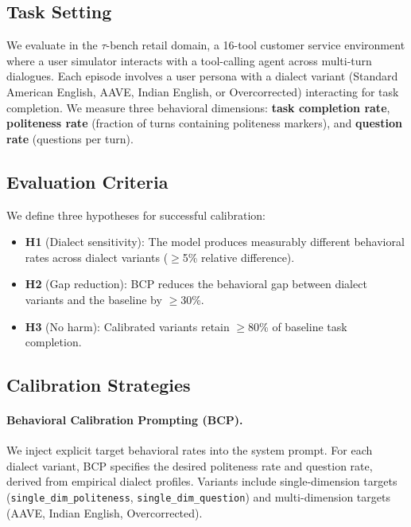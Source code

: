 \documentclass[11pt,a4paper]{article}
\begin{document}
\subsection{Task Setting}

We evaluate in the $\tau$-bench retail domain, a 16-tool customer service environment where a user simulator interacts with a tool-calling agent across multi-turn dialogues.
Each episode involves a user persona with a dialect variant (Standard American English, AAVE, Indian English, or Overcorrected) interacting for task completion.
We measure three behavioral dimensions: \textbf{task completion rate}, \textbf{politeness rate} (fraction of turns containing politeness markers), and \textbf{question rate} (questions per turn).

\subsection{Evaluation Criteria}

We define three hypotheses for successful calibration:
\begin{itemize}[nosep]
    \item \textbf{H1} (Dialect sensitivity): The model produces measurably different behavioral rates across dialect variants ($\geq$5\% relative difference).
    \item \textbf{H2} (Gap reduction): BCP reduces the behavioral gap between dialect variants and the baseline by $\geq$30\%.
    \item \textbf{H3} (No harm): Calibrated variants retain $\geq$80\% of baseline task completion.
\end{itemize}

\subsection{Calibration Strategies}

\paragraph{Behavioral Calibration Prompting (BCP).}
We inject explicit target behavioral rates into the system prompt.
For each dialect variant, BCP specifies the desired politeness rate and question rate, derived from empirical dialect profiles.
Variants include single-dimension targets (\texttt{single\_dim\_politeness}, \texttt{single\_dim\_question}) and multi-dimension targets (AAVE, Indian English, Overcorrected).
\end{document}
